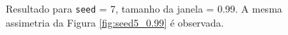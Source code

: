 \begin{figure}[ht!]
	\vspace{1mm}	
	\begin{center}
	\end{center}
	\vspace{1mm}	
	\caption{Resultado para \texttt{seed} = 7, tamanho da janela = 0.99. A mesma assimetria da Figura \ref{fig:seed5_0.99} é observada.} 
	\label{fig:seed7_0.99}
\end{figure}


